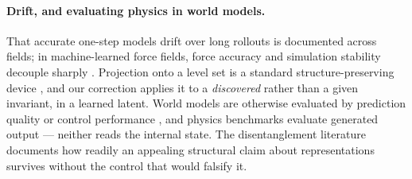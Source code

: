 \paragraph{Drift, and evaluating physics in world models.}
That accurate one-step models drift over long rollouts is documented across fields; in machine-learned
force fields, force accuracy and simulation stability decouple sharply \citep{fu2023forces}. Projection
onto a level set is a standard structure-preserving device \citep{hairer2006geometric2}, and our
correction applies it to a \emph{discovered} rather than a given invariant, in a learned latent. World
models are otherwise evaluated by prediction quality or control performance
\citep{hafner2023dreamerv3,ha2018world,schrittwieser2020muzero}, and physics benchmarks evaluate
generated output --- neither reads the internal state. The disentanglement literature
\citep{locatello2019challenging} documents how readily an appealing structural claim about
representations survives without the control that would falsify it.
